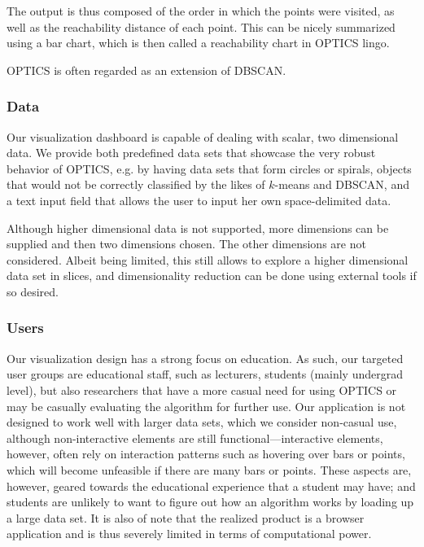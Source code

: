 \documentclass{vgtc} %
\begin{document}
The output is thus composed of the order in which the points were visited, as
well as the reachability distance of each point. This can be nicely summarized
using a bar chart, which is then called a reachability chart in OPTICS lingo.

OPTICS is often regarded as an extension of DBSCAN.

\subsubsection{Data}

Our visualization dashboard is capable of dealing with scalar, two dimensional
data. We provide both predefined data sets that showcase the very robust
behavior of OPTICS, e.g. by having data sets that form circles or spirals,
objects that would not be correctly classified by the likes of $k$-means and
DBSCAN, and a text input field that allows the user to input her own
space-delimited data.

Although higher dimensional data is not supported, more dimensions can be
supplied and then two dimensions chosen. The other dimensions are not
considered. Albeit being limited, this still allows to explore a higher
dimensional data set in slices, and dimensionality reduction can be done
using external tools if so desired.

\subsubsection{Users}

Our visualization design has a strong focus on education. As such, our targeted
user groups are educational staff, such as lecturers, students (mainly
undergrad level), but also researchers that have a more casual need for using
OPTICS or may be casually evaluating the algorithm for further use. Our
application is not designed to work well with larger data sets, which we
consider non-casual use, although non-interactive elements are still
functional---interactive elements, however, often rely on interaction patterns
such as hovering over bars or points, which will become unfeasible if there are
many bars or points. These aspects are, however, geared towards the educational
experience that a student may have; and students are unlikely to want to figure
out how an algorithm works by loading up a large data set. It is also of note
that the realized product is a browser application and is thus severely limited
in terms of computational power.
\end{document}
